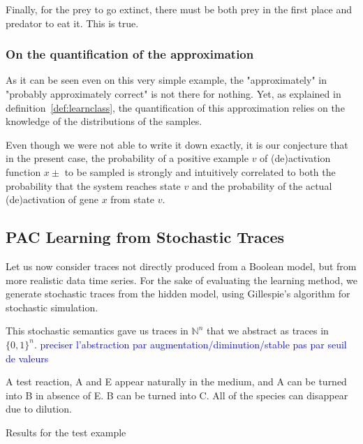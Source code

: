 \documentclass{llncs}
\newcommand{\francois}[1]{\textcolor{blue}{#1}}
\begin{document}
Finally, for the prey to go extinct, there must be both prey in the first place and predator to eat it. This is true.

\subsubsection{On the quantification of the approximation}

As it can be seen even on this very simple example, the "approximately" in "probably approximately correct" is not there for nothing. Yet, as explained in definition~\ref{def:learnclass}, the quantification of this approximation relies on the knowledge of the distributions of the samples.

Even though we were not able to write it down exactly, it is our conjecture that in the present case, the probability of a positive example $v$ of (de)activation function $x\pm$ to be sampled is strongly and intuitively correlated to both the probability that the system reaches state $v$ and the probability of the actual (de)activation of gene $x$ from state $v$. 



\subsection{PAC Learning from Stochastic Traces}

Let us now consider traces not directly produced from a Boolean model, but from more realistic data time series.
For the sake of evaluating the learning method,
we generate stochastic traces from the hidden model, using Gillespie's algorithm for stochastic simulation.

This stochastic semantics gave us traces in ${\mathbb{N}}^n$ that we abstract as traces in ${\{0,1\}}^n$.
\francois{preciser l'abstraction par augmentation/diminution/stable pas par seuil de valeurs} 

\begin{listfig}[hp]
	
	\caption{A test reaction, A and E appear naturally in the medium, and A can be turned into B in absence of E. B  can be turned into C. All of the species can disappear due to dilution.\label{test}}
\end{listfig}
\begin{listfig}[hp]
	
	\caption{Results for the test example\label{test_res}}
\end{listfig}
\end{document}
